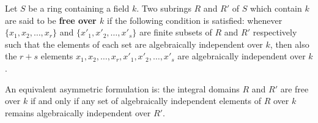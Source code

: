 Let $S$ be a ring containing a field $k$. Two subrings $R$ and $R'$ of $S$ which contain $k$ are said to be \textbf{free over $k$} if the following condition is satisfied: whenever $\{x_1, x_2, \dots, x_r\}$ and $\{x'_1, x'_2, \dots, x'_s\}$ are finite subsets of $R$ and $R'$ respectively such that the elements of each set are algebraically independent over $k$, then also the $r + s$ elements $x_1, x_2, \dots, x_r, x'_1, x'_2, \dots, x'_s$ are algebraically independent over $k$.

An equivalent asymmetric formulation is: the integral domains $R$ and $R'$ are free over $k$ if and only if any set of algebraically independent elements of $R$ over $k$ remains algebraically independent over $R'$.
